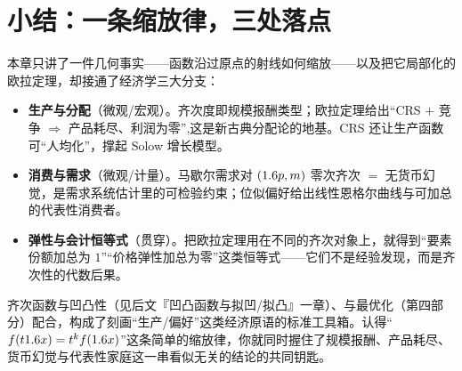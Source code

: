 \section{小结：一条缩放律，三处落点}
\label{sec:homogeneous-summary}

本章只讲了一件几何事实——函数沿过原点的射线如何缩放——以及把它局部化的欧拉定理，却接通了经济学三大分支：

\begin{itemize}
    \item \textbf{生产与分配}（微观/宏观）。齐次度即规模报酬类型；欧拉定理给出``CRS $+$ 竞争 $\Rightarrow$ 产品耗尽、利润为零'',这是新古典分配论的地基。CRS 还让生产函数可``人均化''，撑起 Solow 增长模型。
    \item \textbf{消费与需求}（微观/计量）。马歇尔需求对 $(1.6 p,m)$ 零次齐次 $=$ 无货币幻觉，是需求系统估计里的可检验约束；位似偏好给出线性恩格尔曲线与可加总的代表性消费者。
    \item \textbf{弹性与会计恒等式}（贯穿）。把欧拉定理用在不同的齐次对象上，就得到``要素份额加总为 $1$''``价格弹性加总为零''这类恒等式——它们不是经验发现，而是齐次性的代数后果。
\end{itemize}

齐次函数与凹凸性（见后文『凹凸函数与拟凹/拟凸』一章）、与最优化（第四部分）配合，构成了刻画``生产/偏好''这类经济原语的标准工具箱。认得``$f(t1.6 x)=t^k f(1.6 x)$''这条简单的缩放律，你就同时握住了规模报酬、产品耗尽、货币幻觉与代表性家庭这一串看似无关的结论的共同钥匙。
